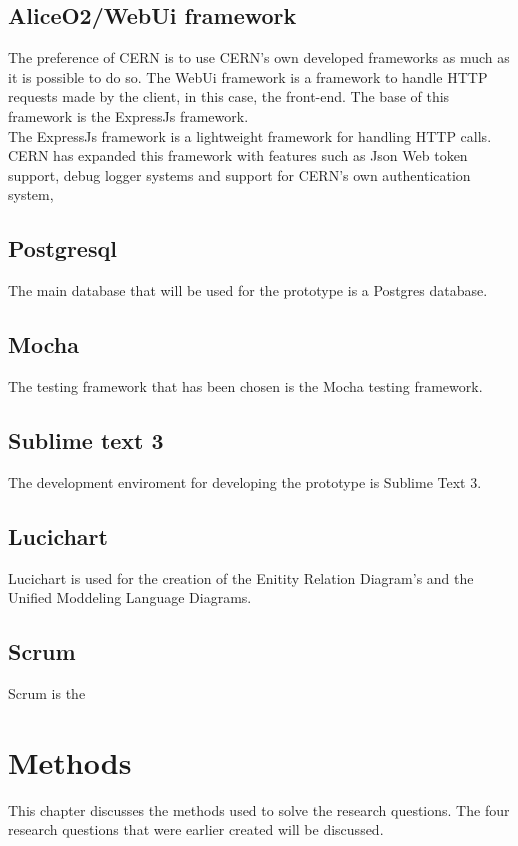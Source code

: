 \documentclass[paper=a4, fontsize=11pt,twoside]{scrartcl}	%
\begin{document}
\subsection{AliceO2/WebUi framework}
The preference of CERN is to use CERN's own developed frameworks as much as it is possible to do so. The WebUi framework is a framework to handle HTTP requests made by the client, in this case, the front-end. The base of this framework is the ExpressJs framework. \\
The ExpressJs framework is a lightweight framework for handling HTTP calls. CERN has expanded this framework with features such as Json Web token support, debug logger systems and support for CERN's own authentication system,

\subsection{Postgresql}
The main database that will be used for the prototype is a Postgres database. 

\subsection{Mocha}
The testing framework that has been chosen is the Mocha testing framework.

\subsection{Sublime text 3}
The development enviroment for developing the prototype is Sublime Text 3.

\subsection{Lucichart}
Lucichart is used for the creation of the Enitity Relation Diagram's and the Unified Moddeling Language Diagrams.

\subsection{Scrum}
Scrum is the 

\newpage


\section{Methods}
This chapter discusses the methods used to solve the research questions. The four research questions that were earlier created will be discussed. 
\end{document}
